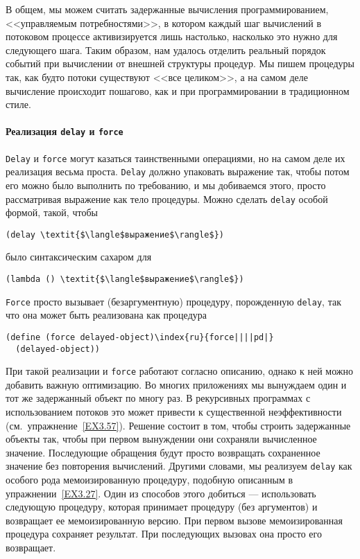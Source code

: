 В общем, мы можем считать задержанные вычисления
 программированием, <<управляемым потребностями>>, в
котором каждый шаг
вычислений в потоковом процессе активизируется лишь настолько,
насколько это нужно для следующего шага.  Таким образом, нам удалось
отделить реальный  порядок событий
при вычислении от внешней структуры
процедур.  Мы пишем процедуры так, как будто потоки существуют <<все
целиком>>, а на самом деле вычисление происходит пошагово, как и при
программировании в традиционном стиле.

\paragraph{Реализация {\tt delay} и {\tt force}}


{\tt Delay} и {\tt force}
могут казаться таинственными операциями, но на самом деле их реализация
весьма проста. {\tt Delay} должно упаковать выражение так,
чтобы потом его можно было выполнить по требованию, и мы добиваемся
этого, просто рассматривая выражение как тело процедуры. Можно сделать
{\tt delay} особой формой, такой, чтобы

\begin{Verbatim}[fontsize=\small]
(delay \textit{$\langle$выражение$\rangle$})
\end{Verbatim}

было синтаксическим сахаром для

\begin{Verbatim}[fontsize=\small]
(lambda () \textit{$\langle$выражение$\rangle$})
\end{Verbatim}

{\tt Force} просто вызывает (безаргументную) процедуру,
порожденную {\tt delay}, так что она может быть реализована как
процедура

\begin{Verbatim}[fontsize=\small]
(define (force delayed-object)\index{ru}{force||||pd|}
  (delayed-object))
\end{Verbatim}


При такой реализации  и
{\tt force} работают согласно описанию, однако к ней можно
добавить важную оптимизацию.  Во многих приложениях мы вынуждаем
один и тот же задержанный объект по многу раз.  В рекурсивных
программах с использованием потоков это может привести к существенной
неэффективности (см.~упражнение~\ref{EX3.57}).  Решение
состоит в том, чтобы строить задержанные объекты так, чтобы при первом
вынуждении они сохраняли вычисленное значение.  Последующие
обращения будут просто возвращать сохраненное значение без повторения
вычислений.  Другими словами, мы реализуем {\tt delay} как
особого рода мемоизированную процедуру, подобную описанным в
упражнении~\ref{EX3.27}.  Один из способов этого добиться
--- использовать следующую процедуру, которая принимает процедуру (без
аргументов) и возвращает ее мемоизированную версию.
При первом вызове мемоизированная процедура сохраняет результат.  При
последующих вызовах она просто его возвращает.

